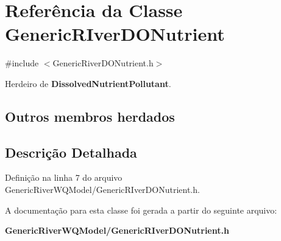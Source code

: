 \section{Referência da Classe Generic\+R\+Iver\+D\+O\+Nutrient}
\label{class_generic_r_iver_d_o_nutrient}


{\ttfamily \#include $<$Generic\+River\+D\+O\+Nutrient.\+h$>$}



Herdeiro de {\bf Dissolved\+Nutrient\+Pollutant}.

\subsection*{Outros membros herdados}


\subsection{Descrição Detalhada}


Definição na linha 7 do arquivo Generic\+River\+W\+Q\+Model/\+Generic\+R\+Iver\+D\+O\+Nutrient.\+h.



A documentação para esta classe foi gerada a partir do seguinte arquivo\+:\begin{DoxyCompactItemize}
\item 
{\bf Generic\+River\+W\+Q\+Model/\+Generic\+R\+Iver\+D\+O\+Nutrient.\+h}\end{DoxyCompactItemize}
